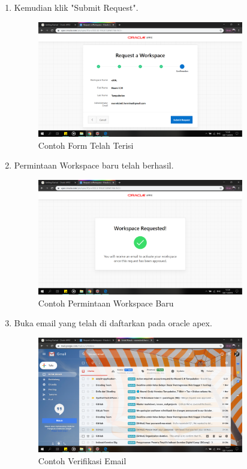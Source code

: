 \begin{enumerate}
\item Kemudian klik "Submit Request".
    \begin{figure}[!htbp]
    \centering
    \includegraphics[width=9cm]{picture/10.png}
    \caption{Contoh Form Telah Terisi}
    \end{figure}
    
\item Permintaan Workspace baru telah berhasil.
    \begin{figure}[!htbp]
    \centering
    \includegraphics[width=9cm]{picture/11.png}
    \caption{Contoh Permintaan Workspace Baru}
    \end{figure}
        
\newpage
\item Buka email yang telah di daftarkan pada oracle apex.
    \begin{figure}[!htbp]
    \centering
    \includegraphics[width=9cm]{picture/12.png}
    \caption{Contoh Verifikasi Email}
    \end{figure}
    

\end{enumerate}
